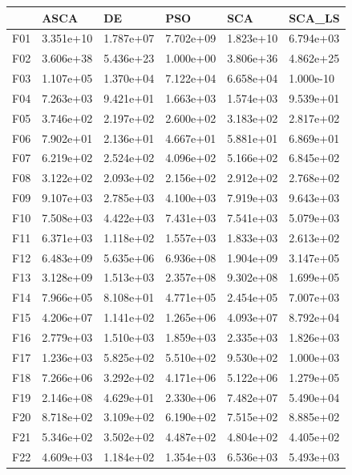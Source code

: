 \begin{tabular}{llllll}
\toprule
{} &       ASCA &         DE &        PSO &        SCA &     SCA\_LS \\
\midrule
F01  &  3.351e+10 &  1.787e+07 &  7.702e+09 &  1.823e+10 &  6.794e+03 \\
F02  &  3.606e+38 &  5.436e+23 &  1.000e+00 &  3.806e+36 &  4.862e+25 \\
F03  &  1.107e+05 &  1.370e+04 &  7.122e+04 &  6.658e+04 &  1.000e-10 \\
F04  &  7.263e+03 &  9.421e+01 &  1.663e+03 &  1.574e+03 &  9.539e+01 \\
F05  &  3.746e+02 &  2.197e+02 &  2.600e+02 &  3.183e+02 &  2.817e+02 \\
F06  &  7.902e+01 &  2.136e+01 &  4.667e+01 &  5.881e+01 &  6.869e+01 \\
F07  &  6.219e+02 &  2.524e+02 &  4.096e+02 &  5.166e+02 &  6.845e+02 \\
F08  &  3.122e+02 &  2.093e+02 &  2.156e+02 &  2.912e+02 &  2.768e+02 \\
F09  &  9.107e+03 &  2.785e+03 &  4.100e+03 &  7.919e+03 &  9.643e+03 \\
F10  &  7.508e+03 &  4.422e+03 &  7.431e+03 &  7.541e+03 &  5.079e+03 \\
F11  &  6.371e+03 &  1.118e+02 &  1.557e+03 &  1.833e+03 &  2.613e+02 \\
F12  &  6.483e+09 &  5.635e+06 &  6.936e+08 &  1.904e+09 &  3.147e+05 \\
F13  &  3.128e+09 &  1.513e+03 &  2.357e+08 &  9.302e+08 &  1.699e+05 \\
F14  &  7.966e+05 &  8.108e+01 &  4.771e+05 &  2.454e+05 &  7.007e+03 \\
F15  &  4.206e+07 &  1.141e+02 &  1.265e+06 &  4.093e+07 &  8.792e+04 \\
F16  &  2.779e+03 &  1.510e+03 &  1.859e+03 &  2.335e+03 &  1.826e+03 \\
F17  &  1.236e+03 &  5.825e+02 &  5.510e+02 &  9.530e+02 &  1.000e+03 \\
F18  &  7.266e+06 &  3.292e+02 &  4.171e+06 &  5.122e+06 &  1.279e+05 \\
F19  &  2.146e+08 &  4.629e+01 &  2.330e+06 &  7.482e+07 &  5.490e+04 \\
F20  &  8.718e+02 &  3.109e+02 &  6.190e+02 &  7.515e+02 &  8.885e+02 \\
F21  &  5.346e+02 &  3.502e+02 &  4.487e+02 &  4.804e+02 &  4.405e+02 \\
F22  &  4.609e+03 &  1.184e+02 &  1.354e+03 &  6.536e+03 &  5.493e+03 \\

\end{tabular}
